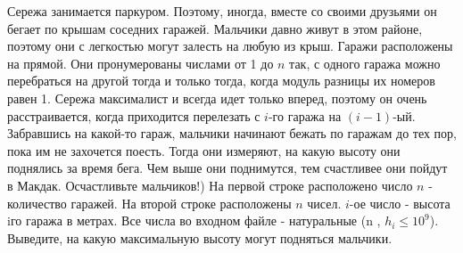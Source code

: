 Сережа занимается паркуром. Поэтому, иногда, вместе со своими друзьями он бегает по крышам соседних гаражей. 
Мальчики давно живут в этом районе, поэтому они с легкостью могут залесть на любую из крыш. Гаражи расположены на прямой. 
Они пронумерованы числами от 1 до $n$ так, с одного гаража можно перебраться на другой тогда и только тогда, когда модуль
разницы их номеров равен 1. Сережа максималист и всегда идет только вперед, поэтому он очень расстраивается, 
когда приходится перелезать с $i$-го гаража на $(i - 1)$-ый. 
Забравшись на какой-то гараж, мальчики начинают бежать по гаражам до тех пор, 
пока им не захочется поесть. Тогда они измеряют, на какую высоту они поднялись за время бега. Чем выше они поднимутся, 
тем счастливее они пойдут в Макдак. Осчастливьте мальчиков!)
\InputFile
На первой строке расположено число $n$ - количество гаражей.
На второй строке расположены $n$ чисел. $i$-ое число - высота iго гаража в метрах.
Все числа во входном файле - натуральные (n , $h_i \le 10^9$).
\OutputFile
Выведите, на какую максимальную высоту могут подняться мальчики.

